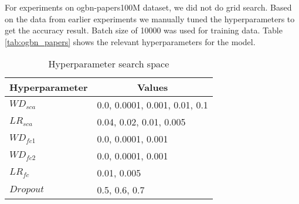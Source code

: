 \documentclass[sigconf,natbib=false]{acmart}
\begin{document}
For experiments on ogbn-papers100M dataset, we did not do grid search. Based on the data from earlier experiments we manually tuned the hyperparameters to get the accuracy result. Batch size of 10000 was used for training data. Table \ref{tab:ogbn_papers} shows the relevant hyperparameters for the model.


\begin{table}[h]
\centering
\caption{Hyperparameter search space}
\label{tab:param_search}
\begin{tabular}{ll} 
\toprule
\textbf{Hyperparameter} & \multicolumn{1}{c}{\textbf{Values}}  \\ 
\hline
\textbf{$WD_{sca}$}          & 0.0, 0.0001, 0.001, 0.01, 0.1        \\
\textbf{$LR_{sca}$}          & 0.04, 0.02, 0.01, 0.005              \\
\textbf{$WD_{fc1}$}          & 0.0, 0.0001, 0.001                   \\
\textbf{$WD_{fc2}$}          & 0.0, 0.0001, 0.001                   \\
\textbf{$LR_{fc}$}           & 0.01, 0.005                          \\
\textbf{$Dropout$}        & 0.5, 0.6, 0.7                        \\
\bottomrule
\end{tabular}
\end{table}
\end{document}
